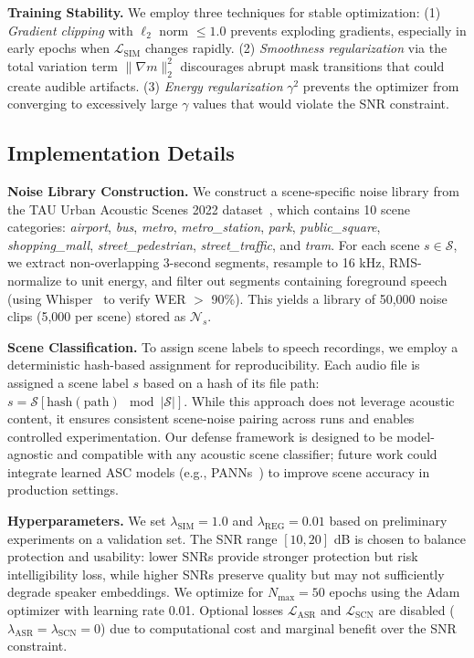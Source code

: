 \textbf{Training Stability.}
We employ three techniques for stable optimization: (1) \textit{Gradient clipping} with $\ell_2$ norm $\leq 1.0$ prevents exploding gradients, especially in early epochs when $\mathcal{L}_{\text{SIM}}$ changes rapidly. (2) \textit{Smoothness regularization} via the total variation term $\| \nabla m \|_2^2$ discourages abrupt mask transitions that could create audible artifacts. (3) \textit{Energy regularization} $\gamma^2$ prevents the optimizer from converging to excessively large $\gamma$ values that would violate the SNR constraint.


\subsection{Implementation Details}

\textbf{Noise Library Construction.}
We construct a scene-specific noise library from the TAU Urban Acoustic Scenes 2022 dataset~\citep{tau_dataset}, which contains 10 scene categories: \textit{airport}, \textit{bus}, \textit{metro}, \textit{metro\_station}, \textit{park}, \textit{public\_square}, \textit{shopping\_mall}, \textit{street\_pedestrian}, \textit{street\_traffic}, and \textit{tram}. For each scene $s \in \mathcal{S}$, we extract non-overlapping 3-second segments, resample to 16 kHz, RMS-normalize to unit energy, and filter out segments containing foreground speech (using Whisper~\citep{whisper} to verify WER $>$ 90\%). This yields a library of 50,000 noise clips (5,000 per scene) stored as $\mathcal{N}_s$.

\textbf{Scene Classification.}
To assign scene labels to speech recordings, we employ a deterministic hash-based assignment for reproducibility. Each audio file is assigned a scene label $s$ based on a hash of its file path: $s = \mathcal{S}[\text{hash}(\text{path}) \mod |\mathcal{S}|]$. While this approach does not leverage acoustic content, it ensures consistent scene-noise pairing across runs and enables controlled experimentation. Our defense framework is designed to be model-agnostic and compatible with any acoustic scene classifier; future work could integrate learned ASC models (e.g., PANNs~\citep{kong2020panns}) to improve scene accuracy in production settings.

\textbf{Hyperparameters.}
We set $\lambda_{\text{SIM}} = 1.0$ and $\lambda_{\text{REG}} = 0.01$ based on preliminary experiments on a validation set. The SNR range $[10, 20]$ dB is chosen to balance protection and usability: lower SNRs provide stronger protection but risk intelligibility loss, while higher SNRs preserve quality but may not sufficiently degrade speaker embeddings. We optimize for $N_{\max} = 50$ epochs using the Adam optimizer with learning rate 0.01. Optional losses $\mathcal{L}_{\text{ASR}}$ and $\mathcal{L}_{\text{SCN}}$ are disabled ($\lambda_{\text{ASR}} = \lambda_{\text{SCN}} = 0$) due to computational cost and marginal benefit over the SNR constraint.

